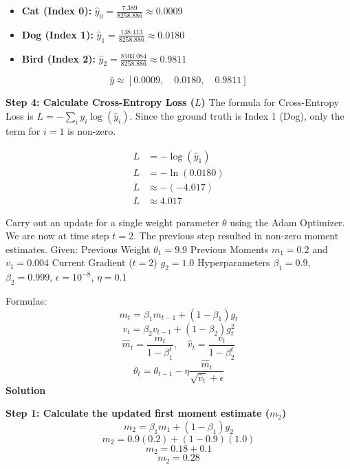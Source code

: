 \documentclass[12pt]{exam}
\begin{document}
\begin{questions}
                \begin{itemize}
                    \item \textbf{Cat (Index 0):} $\hat{y}_0 = \frac{7.389}{8258.886} \approx 0.0009$
                    \item \textbf{Dog (Index 1):} $\hat{y}_1 = \frac{148.413}{8258.886} \approx 0.0180$
                    \item \textbf{Bird (Index 2):} $\hat{y}_2 = \frac{8103.084}{8258.886} \approx 0.9811$
                \end{itemize}
                
                \[ \hat{y} \approx [0.0009, \quad 0.0180, \quad 0.9811] \]
                
                \textbf{Step 4: Calculate Cross-Entropy Loss ($L$)}
                The formula for Cross-Entropy Loss is $L = - \sum_{i} y_i \log(\hat{y}_i)$.
                Since the ground truth is Index 1 (Dog), only the term for $i=1$ is non-zero.
                
                \begin{align*}
                    L &= - \log(\hat{y}_1) \\
                    L &= - \ln(0.0180) \\
                    L &\approx -(-4.017) \\
                    L &\approx \mathbf{4.017}
                \end{align*}
                
                \question[8] Carry out an update for a single weight parameter $\theta$ using the Adam Optimizer. We are now at time step $t=2$. The previous step resulted in non-zero moment estimates. Given:
                Previous Weight $\theta_{1} = 9.9$
                Previous Moments $m_{1} = 0.2$ and $v_{1} = 0.004$
                Current Gradient ($t=2$) $g_2 = 1.0$
                Hyperparameters $\beta_1 = 0.9$, $\beta_2 = 0.999$, $\epsilon = 10^{-8}$, $\eta = 0.1$
                
                Formulas:
                \[ m_t = \beta_1 m_{t-1} + (1 - \beta_1) g_t \]
                \[ v_t = \beta_2 v_{t-1} + (1 - \beta_2) g_t^2 \]
                \[ \hat{m}_t = \frac{m_t}{1 - \beta_1^t}, \quad \hat{v}_t = \frac{v_t}{1 - \beta_2^t} \]
                \[ \theta_t = \theta_{t-1} - \eta \frac{\hat{m}_t}{\sqrt{\hat{v}_t} + \epsilon} \]
                \textbf{Solution}

                \textbf{Step 1: Calculate the updated first moment estimate ($m_2$)}
                \[ m_2 = \beta_1 m_{1} + (1 - \beta_1) g_2 \]
                \[ m_2 = 0.9(0.2) + (1 - 0.9)(1.0) \]
                \[ m_2 = 0.18 + 0.1 \]
                \[ m_2 = 0.28 \]
                

\end{questions}
\end{document}

